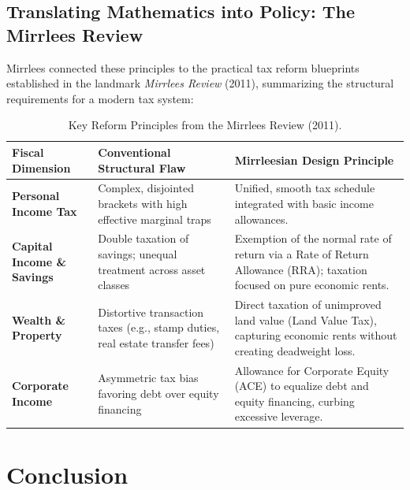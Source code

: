 \documentclass[11pt,a4paper]{article}
\begin{document}
\subsection{Translating Mathematics into Policy: The Mirrlees Review}
Mirrlees connected these principles to the practical tax reform blueprints established in the landmark \textit{Mirrlees Review} (2011), summarizing the structural requirements for a modern tax system:

\begin{table}[htbp]
\centering
\small
\begin{tabular}{@{}p{3.2cm}p{5.5cm}p{6cm}@{}}
\toprule
\textbf{Fiscal Dimension} & \textbf{Conventional Structural Flaw} & \textbf{Mirrleesian Design Principle} \\ \midrule
\textbf{Personal Income Tax} & Complex, disjointed brackets with high effective marginal traps & Unified, smooth tax schedule integrated with basic income allowances. \\ \addlinespace
\textbf{Capital Income \& Savings} & Double taxation of savings; unequal treatment across asset classes & Exemption of the normal rate of return via a Rate of Return Allowance (RRA); taxation focused on pure economic rents. \\ \addlinespace
\textbf{Wealth \& Property} & Distortive transaction taxes (e.g., stamp duties, real estate transfer fees) & Direct taxation of unimproved land value (Land Value Tax), capturing economic rents without creating deadweight loss. \\ \addlinespace
\textbf{Corporate Income} & Asymmetric tax bias favoring debt over equity financing & Allowance for Corporate Equity (ACE) to equalize debt and equity financing, curbing excessive leverage. \\ \bottomrule
\end{tabular}
\caption{Key Reform Principles from the Mirrlees Review (2011).}
\end{table}

\section{Conclusion}
\end{document}
